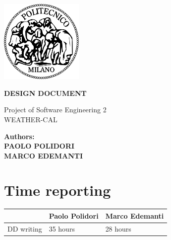 \documentclass[a4paper,12pt]{book}
\begin{document}
 \begin{center}
    \includegraphics[width=4cm]{../RASD/immagini/polilogo.png}
    \end{center}
\begin{center}

{\huge{\bf\uppercase {Design Document}}}


\end{center}
\vspace*{0.5cm}
\begin{center}
{\large Project of Software Engineering 2\\ \vspace*{0.5cm} \huge WEATHER-CAL}
\end{center}
\begin{flushright}
 \vspace*{9cm}

        {\bf Authors: }\\
        \vspace*{0.2cm}
            {\bf   {PAOLO POLIDORI} }\\
             \vspace*{0.3cm}
            {\bf   {MARCO EDEMANTI} }
    \end{flushright}

\doublespacing    
\tableofcontents




\chapter*{Time reporting}
\begin{tabularx}{\linewidth}{|r|X|X|}
  \hline  & {\bf Paolo Polidori} & {\bf Marco Edemanti}\\
  \hline DD writing & 35 hours & 28 hours\\
  \hline
\end{tabularx}\\
\listoffigures
\end{document}
